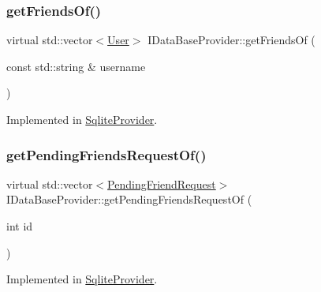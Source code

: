 \subsubsection{\texorpdfstring{get\+Friends\+Of()}{getFriendsOf()}\hspace{0.1cm}{\footnotesize\ttfamily [2/2]}}
{\footnotesize\ttfamily virtual std\+::vector$<$\mbox{\hyperlink{structUser}{User}}$>$ I\+Data\+Base\+Provider\+::get\+Friends\+Of (\begin{DoxyParamCaption}\item[{const std\+::string \&}]{username }\end{DoxyParamCaption})\hspace{0.3cm}{\ttfamily [pure virtual]}}



Implemented in \mbox{\hyperlink{classSqliteProvider_a19b97c70f002b84aa6a41d2d2dc9c44d}{Sqlite\+Provider}}.

\mbox{\label{classIDataBaseProvider_ad30f529c809222d72f94d15de95d44b2}} 
\subsubsection{\texorpdfstring{get\+Pending\+Friends\+Request\+Of()}{getPendingFriendsRequestOf()}\hspace{0.1cm}{\footnotesize\ttfamily [1/2]}}
{\footnotesize\ttfamily virtual std\+::vector$<$\mbox{\hyperlink{structPendingFriendRequest}{Pending\+Friend\+Request}}$>$ I\+Data\+Base\+Provider\+::get\+Pending\+Friends\+Request\+Of (\begin{DoxyParamCaption}\item[{int}]{id }\end{DoxyParamCaption})\hspace{0.3cm}{\ttfamily [pure virtual]}}



Implemented in \mbox{\hyperlink{classSqliteProvider_a199db7e0313f5e485fcf67d5a9864233}{Sqlite\+Provider}}.

\mbox{\label{classIDataBaseProvider_a376d53c78f3e101b9c0e4540330cce5b}} 
